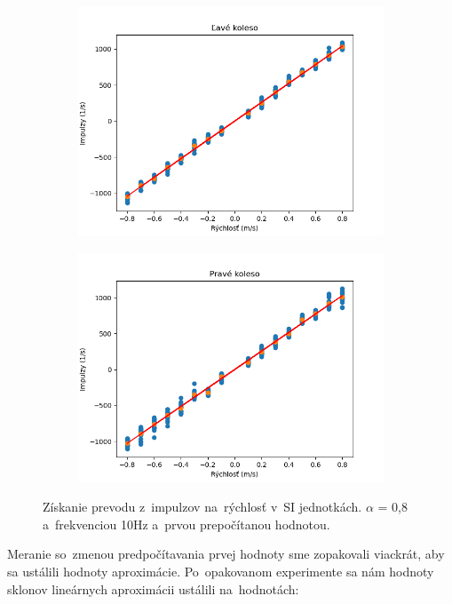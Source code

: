 \begin{figure}[!htbp]
	\begin{subfigure}{0.5\textwidth}
		\includegraphics[width=\textwidth]{img/lw_08100_3.png}
	\end{subfigure}
	\hfill
	\begin{subfigure}{0.5\textwidth}
		\includegraphics[width=\textwidth]{img/rw_08100_3.png}
	\end{subfigure}
	\caption{Získanie prevodu z~impulzov na~rýchlosť v~SI jednotkách. $\alpha$ = 0,8 a~frekvenciou 10Hz a~prvou prepočítanou hodnotou.}
	\label{fig:rw_lw_08100_3}
\end{figure}

Meranie so~zmenou predpočítavania prvej hodnoty sme zopakovali viackrát, aby sa ustálili hodnoty aproximácie.
Po~opakovanom experimente sa nám hodnoty sklonov lineárnych aproximácii ustálili na~hodnotách:

